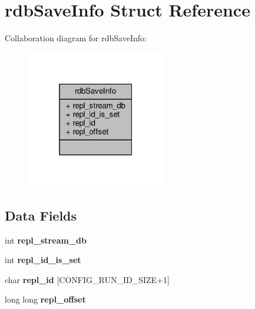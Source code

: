\hypertarget{structrdbSaveInfo}{}\section{rdb\+Save\+Info Struct Reference}
\label{structrdbSaveInfo}


Collaboration diagram for rdb\+Save\+Info\+:\nopagebreak
\begin{figure}[H]
\begin{center}
\leavevmode
\includegraphics[width=172pt]{structrdbSaveInfo__coll__graph}
\end{center}
\end{figure}
\subsection*{Data Fields}
\begin{DoxyCompactItemize}
\item 
\mbox{\label{structrdbSaveInfo_abd96ba0427f13985ca7db8df8212c41a}} 
int {\bfseries repl\+\_\+stream\+\_\+db}
\item 
\mbox{\label{structrdbSaveInfo_a15395db915e510ef8f43e59c0fa5ad5b}} 
int {\bfseries repl\+\_\+id\+\_\+is\+\_\+set}
\item 
\mbox{\label{structrdbSaveInfo_a7783645ebfcf5df133bc4b91ba725243}} 
char {\bfseries repl\+\_\+id} \mbox{[}C\+O\+N\+F\+I\+G\+\_\+\+R\+U\+N\+\_\+\+I\+D\+\_\+\+S\+I\+ZE+1\mbox{]}
\item 
\mbox{\label{structrdbSaveInfo_a60d50fcc78cb0466590f7783161c52d2}} 
long long {\bfseries repl\+\_\+offset}
\end{DoxyCompactItemize}



